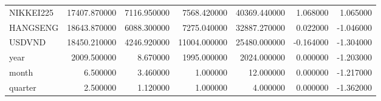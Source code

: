 \begin{tabular}{lrrrrrr}
NIKKEI225 & 17407.870000 & 7116.950000 & 7568.420000 & 40369.440000 & 1.068000 & 1.065000 \\
HANGSENG & 18643.870000 & 6088.300000 & 7275.040000 & 32887.270000 & 0.022000 & -1.046000 \\
USDVND & 18450.210000 & 4246.920000 & 11004.000000 & 25480.000000 & -0.164000 & -1.304000 \\
year & 2009.500000 & 8.670000 & 1995.000000 & 2024.000000 & 0.000000 & -1.203000 \\
month & 6.500000 & 3.460000 & 1.000000 & 12.000000 & 0.000000 & -1.217000 \\
quarter & 2.500000 & 1.120000 & 1.000000 & 4.000000 & 0.000000 & -1.362000 \\
\bottomrule
\end{tabular}
